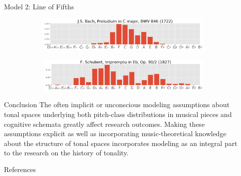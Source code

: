 \documentclass[final]{beamer}
\begin{document}
\begin{frame}[t]
\begin{minipage}[t][.65\textheight][t]{\textwidth}
\begin{columns}[t]
\begin{column}{0.3\textwidth}
\begin{block}{Model 2: Line of Fifths}
\begin{figure}
				\vspace{1em} %

				\begin{subfigure}{\textwidth} %
					\includegraphics[width=\textwidth]{img/gmm_bach.png}
				\end{subfigure}

				\vspace{1em} %

				\begin{subfigure}{\textwidth} %
					\includegraphics[width=\textwidth]{img/gmm_schubert.png}
				\end{subfigure}
			\end{figure}
      \end{block}

			\begin{block}{Conclusion}
        The often implicit or unconscious \alert{modeling assumptions about tonal spaces}
        underlying both pitch-class distributions in musical pieces and cognitive schemata
        greatly affect research outcomes. Making these assumptions explicit
        as well as incorporating music-theoretical knowledge about the
        structure of tonal spaces incorporates modeling as an integral part
        to the research on the history of tonality.
      \end{block}

			\begin{block}{References}
          \printbibliography
      \end{block}


    \end{column}

    \begin{column}{0.3\textwidth}


\end{column}
\end{columns}
\end{minipage}
\end{frame}
\end{document}
